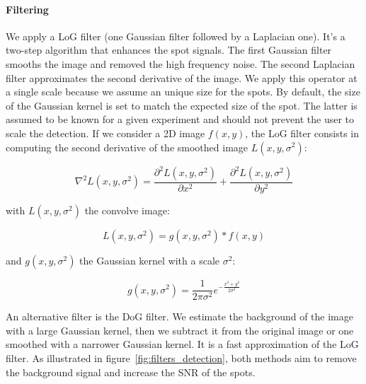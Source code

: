 \paragraph{Filtering}

We apply a \ac{LoG} filter (one Gaussian filter followed by a Laplacian one).
It's a two-step algorithm that enhances the spot signals.
The first Gaussian filter smooths the image and removed the high frequency noise.
The second Laplacian filter approximates the second derivative of the image.
We apply this operator at a single scale because we assume an unique size for the spots.
By default, the size of the Gaussian kernel is set to match the expected size of the spot.
The latter is assumed to be known for a given experiment and should not prevent the user to scale the detection.
If we consider a 2D image $f(x,y)$, the \ac{LoG} filter consists in computing the second derivative of the smoothed image $L(x, y, \sigma^2)$:

\begin{equation}
	\nabla^{2}L(x, y, \sigma^2) = \frac{\partial^{2}L(x, y, \sigma^2)}{\partial x^2} + \frac{\partial^{2}L(x, y, \sigma^2)}{\partial y^2}
\end{equation}

\noindent
with $L(x, y, \sigma^2)$ the convolve image:

\begin{equation}
	L(x, y, \sigma^2) = g(x, y, \sigma^2) * f(x, y)
\end{equation}

\noindent
and $g(x, y, \sigma^2)$ the Gaussian kernel with a scale $\sigma^2$:

\begin{equation}
	g(x, y, \sigma^2) = \frac{1}{2\pi \sigma^2} e^{-{\frac{x^{2} + y^{2}}{2\sigma^2}}}
\end{equation}

An alternative filter is the \ac{DoG} filter.
We estimate the background of the image with a large Gaussian kernel, then we subtract it from the original image or one smoothed with a narrower Gaussian kernel.
It is a fast approximation of the \ac{LoG} filter.
As illustrated in figure~\ref{fig:filters_detection}, both methods aim to remove the background signal and increase the \ac{SNR} of the spots.


